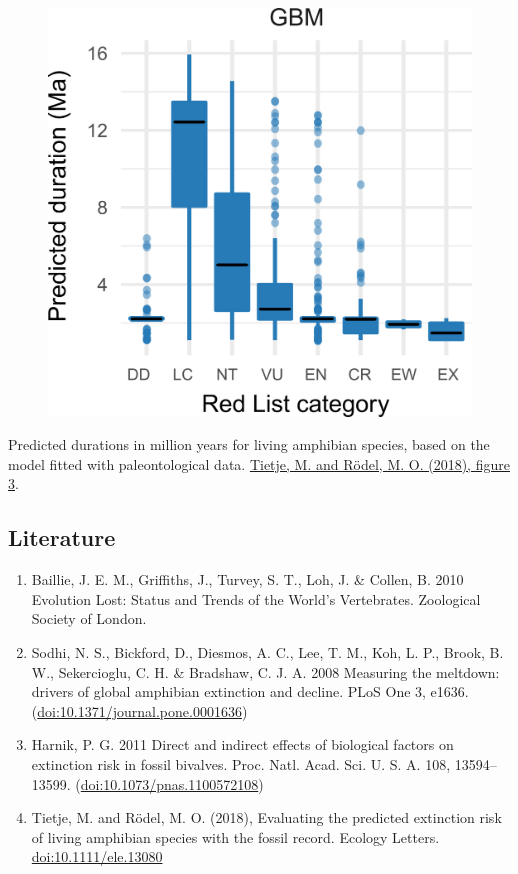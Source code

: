 \documentclass[]{article}
\providecommand{\tightlist}{%
  \setlength{\itemsep}{0pt}\setlength{\parskip}{0pt}}
\begin{document}
\begin{figure}
\centering
\includegraphics{figure3ELE.png}
\caption{}
\end{figure}

 Predicted durations in million years for living amphibian species,
based on the model fitted with paleontological data.
\href{https://doi.org/10.1111/ele.13080}{Tietje, M. and Rödel, M. O.
(2018), figure 3}.

\subsection{Literature}\label{literature-1}

\begin{enumerate}
\def\labelenumi{\arabic{enumi}.}
\tightlist
\item
  Baillie, J. E. M., Griffiths, J., Turvey, S. T., Loh, J. \& Collen, B.
  2010 Evolution Lost: Status and Trends of the World's Vertebrates.
  Zoological Society of London.
\item
  Sodhi, N. S., Bickford, D., Diesmos, A. C., Lee, T. M., Koh, L. P.,
  Brook, B. W., Sekercioglu, C. H. \& Bradshaw, C. J. A. 2008 Measuring
  the meltdown: drivers of global amphibian extinction and decline. PLoS
  One 3, e1636. (\url{doi:10.1371/journal.pone.0001636})
\item
  Harnik, P. G. 2011 Direct and indirect effects of biological factors
  on extinction risk in fossil bivalves. Proc. Natl. Acad. Sci. U. S. A.
  108, 13594--13599. (\url{doi:10.1073/pnas.1100572108})
\item
  Tietje, M. and Rödel, M. O. (2018), Evaluating the predicted
  extinction risk of living amphibian species with the fossil record.
  Ecology Letters.
  \href{https://doi.org/10.1111/ele.13080}{doi:10.1111/ele.13080}
\end{enumerate}
\end{document}
